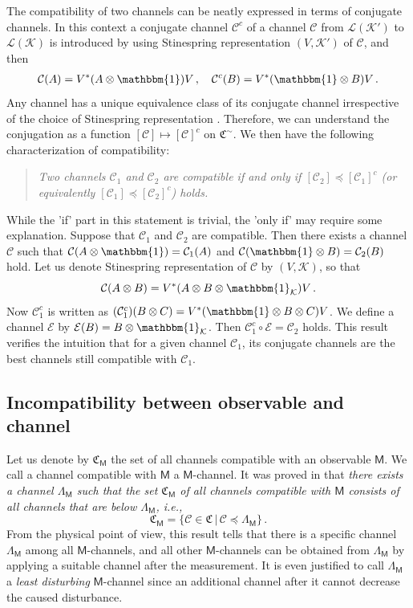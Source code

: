 \documentclass[12pt]{iopart}
\theoremstyle{definition}
\newcommand{\hik}{\mathcal{K}} %
\newcommand{\id}{\mathbbm{1}} %
\newcommand{\Mo}{\mathsf{M}}%
\newcommand{\chan}{\mathfrak{C}}
\newcommand{\ch}[1]{\mathfrak{C}_{#1}}
\newcommand{\Cc}{\mathcal{C}} %
\newcommand{\Ec}{\mathcal{E}} %
\newcommand{\pleq}{\preceq}
\begin{document}
{The compatibility of two channels can be neatly expressed in terms of conjugate channels.
In this context a conjugate channel $\Cc^c$ of a channel $\Cc$ from $\mathcal{L}(\hik')$ to $\mathcal{L}(\hik)$ is 
introduced by using Stinespring representation $(V, \hik')$ of $\Cc$, and then 
\begin{eqnarray*}
\Cc(A) = V^*(A \otimes \id)V \, , \quad \Cc^c(B) = V^*(\id \otimes B)V \, . 
\end{eqnarray*} 
Any channel has a unique equivalence class of its conjugate channel irrespective of the choice of Stinespring representation \cite{HeMi15}. 
Therefore, we can understand the conjugation as a function $[\Cc] \mapsto [\Cc]^c$ on $\chan^\sim$.
We then have the following characterization of compatibility:
\begin{quote}
\emph{Two channels $\Cc_1$ and $\Cc_2$ are compatible if and only if 
$[\Cc_2] \pleq [\Cc_1]^c$ (or equivalently $[\Cc_1]
\pleq [\Cc_2]^c$) holds.} 
\end{quote}

While the 'if' part in this statement is trivial, the 'only if' may require some explanation. 
Suppose that $\Cc_1$ and $\Cc_2$ are compatible. 
Then there exists a channel $\Cc$ such that 
$\Cc(A\otimes \id) = \Cc_1(A)$ and 
$\Cc(\id \otimes B) = \Cc_2(B)$ hold. 
Let us denote Stinespring representation of $\Cc$ by 
$(V, \hik)$, so that
\begin{equation}
\Cc(A\otimes B) = V^*(A\otimes B\otimes \id_{\hik})V \, .
\end{equation}
Now $\Cc_1^c$ is written as 
$(\Cc_1^c)(B \otimes C) = V^*(\id \otimes B\otimes C)V$. 
We define a channel $\Ec$ by 
$\Ec(B ) = B\otimes \id_{\hik}$. Then 
$\Cc_1^c \circ \Ec = \Cc_2$ holds.   
This result verifies the intuition that for a given channel $\Cc_1$, its conjugate channels are the best channels still compatible with $\Cc_1$.
 
\subsection{Incompatibility between observable and channel}

Let us denote by $\ch{\Mo}$ the set of all channels compatible with an observable $\Mo$. 
We call a channel compatible with $\Mo$ a $\Mo$-channel. 
It was proved in \cite{HeMi13} that
\emph{there exists a channel $\Lambda_\Mo$ such that  
the set $\chan_{\Mo}$ of all channels compatible with $\Mo$ consists of all channels that are below $\Lambda_\Mo$, i.e.,
\begin{equation}
\chan_{\Mo}=\{ \Cc \in \chan \, |\,  \Cc \pleq \Lambda_\Mo \} \, .
\end{equation}}
From the physical point of view, this result tells that there is a specific channel $\Lambda_\Mo$ among all $\Mo$-channels, and all other $\Mo$-channels can be obtained from $\Lambda_\Mo$ by applying a suitable channel after the measurement. 
It is even justified to call $\Lambda_\Mo$ a \emph{least disturbing} $\Mo$-channel since an additional channel after it cannot decrease the caused disturbance.

}
\end{document}
